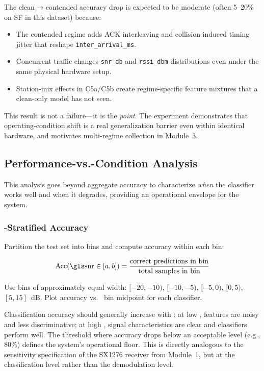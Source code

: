 \documentclass[11pt,letterpaper]{article}
\begin{document}
	\begin{tcolorbox}[infobox={Expected Results}]
		The clean$\to$contended accuracy drop is expected to be moderate (often 5--20\% on SF in this dataset) because:
		\begin{itemize}
			\item The contended regime adds ACK interleaving and collision-induced timing jitter that reshape \texttt{inter\_arrival\_ms}.
			\item Concurrent traffic changes \texttt{snr\_db} and \texttt{rssi\_dbm} distributions even under the same physical hardware setup.
			\item Station-mix effects in C5a/C5b create regime-specific feature mixtures that a clean-only model has not seen.
		\end{itemize}
		This result is not a failure---it is the \emph{point}. The experiment demonstrates that operating-condition shift is a real generalization barrier even within identical hardware, and motivates multi-regime collection in Module~3.
	\end{tcolorbox}

	\subsection{Performance-vs.-Condition Analysis}

	This analysis goes beyond aggregate accuracy to characterize \emph{when} the classifier works well and when it degrades, providing an operational envelope for the system.

	\subsubsection{\SNR{}-Stratified Accuracy}

	Partition the test set into \SNR{} bins and compute accuracy within each bin:

	\begin{equation}
		\text{Acc}(\text{\SNR{}} \in [a, b]) = \frac{\text{correct predictions in bin}}{\text{total samples in bin}}
		\label{eq:snr_acc}
	\end{equation}

	Use bins of approximately equal width: $[-20, -10)$, $[-10, -5)$, $[-5, 0)$, $[0, 5)$, $[5, 15]$~dB. Plot accuracy vs.\ \SNR{} bin midpoint for each classifier.

	\begin{tcolorbox}[infobox={Expected Pattern}]
		Classification accuracy should generally increase with \SNR{}: at low \SNR{}, features are noisy and less discriminative; at high \SNR{}, signal characteristics are clear and classifiers perform well. The \SNR{} threshold where accuracy drops below an acceptable level (e.g., 80\%) defines the system's operational \SNR{} floor. This is directly analogous to the sensitivity specification of the SX1276 receiver from Module~1, but at the \ML{} classification level rather than the demodulation level.
	\end{tcolorbox}
\end{document}
